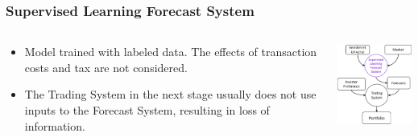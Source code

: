 \begin{frame}
\frametitle{Supervised Learning Forecast System}
\begin{columns}
\begin{column}{0.55\textwidth}
\begin{itemize}
\item
Model trained with labeled data. 
The effects of transaction costs and tax are not considered.
\item
The Trading System in the next stage usually does not use inputs to the Forecast System, resulting in loss of information.
\end{itemize}
\end{column}
\begin{column}{0.45\textwidth}
\begin{center}
\includegraphics[width=4.8cm]{images/supervised_learning.png}
\end{center}
\end{column}
\end{columns}
\end{frame}



